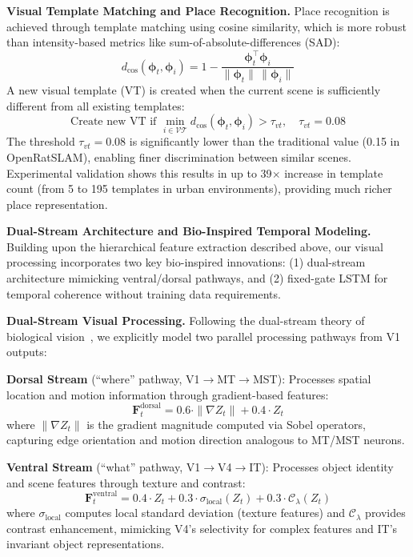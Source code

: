 \textbf{Visual Template Matching and Place Recognition.} Place recognition is achieved through template matching using cosine similarity, which is more robust than intensity-based metrics like sum-of-absolute-differences (SAD):
\begin{equation}
    d_{\cos}(\boldsymbol{\phi}_t,\boldsymbol{\phi}_i)=1-\frac{\boldsymbol{\phi}_t^\top\boldsymbol{\phi}_i}{\lVert\boldsymbol{\phi}_t\rVert\,\lVert\boldsymbol{\phi}_i\rVert}
\end{equation}
A new visual template (VT) is created when the current scene is sufficiently different from all existing templates:
\begin{equation}
    \text{Create new VT if }\min_{i \in \mathcal{VT}} d_{\cos}(\boldsymbol{\phi}_t, \boldsymbol{\phi}_i)>\tau_{vt},\quad \tau_{vt}=0.08
\end{equation}
The threshold $\tau_{vt}=0.08$ is significantly lower than the traditional value (0.15 in OpenRatSLAM), enabling finer discrimination between similar scenes. Experimental validation shows this results in up to 39$\times$ increase in template count (from 5 to 195 templates in urban environments), providing much richer place representation.

\textbf{Dual-Stream Architecture and Bio-Inspired Temporal Modeling.} Building upon the hierarchical feature extraction described above, our visual processing incorporates two key bio-inspired innovations: (1) dual-stream architecture mimicking ventral/dorsal path\-ways, and (2) fixed-gate LSTM for temporal coherence without training data requirements.

\textbf{Dual-Stream Visual Processing.}
Following the dual-stream theory of biological vision~\cite{Goodale1992, Mishkin1983}, we explicitly model two parallel processing path\-ways from V1 outputs:

\textbf{Dorsal Stream} (``where'' pathway, V1$\rightarrow$MT$\rightarrow$MST): Processes spatial location and motion information through gradient-based features:
\begin{equation}
    \mathbf{F}^{\text{dorsal}}_t = 0.6 \cdot \|\nabla Z_t\| + 0.4 \cdot Z_t
\end{equation}
where $\|\nabla Z_t\|$ is the gradient magnitude computed via Sobel operators, capturing edge orientation and motion direction analogous to MT/MST neurons.

\textbf{Ventral Stream} (``what'' pathway, V1$\rightarrow$V4$\rightarrow$IT): Processes object identity and scene features through texture and contrast:
\begin{equation}
    \mathbf{F}^{\text{ventral}}_t = 0.4 \cdot Z_t + 0.3 \cdot \sigma_{\text{local}}(Z_t) + 0.3 \cdot \mathcal{C}_\lambda(Z_t)
\end{equation}
where $\sigma_{\text{local}}$ computes local standard deviation (texture features) and $\mathcal{C}_\lambda$ provides contrast enhancement, mimicking V4's selectivity for complex features and IT's invariant object representations.

